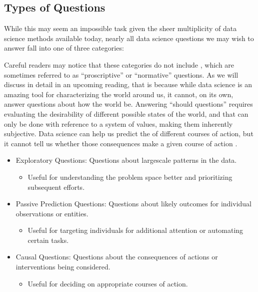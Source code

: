 \documentclass[letterpaper,10pt,english]{jupyterBook}
\begin{document}
\subsection{Types of Questions}
\label{\detokenize{10_introduction/10_our_approach:types-of-questions}}
\sphinxAtStartPar
While this may seem an impossible task given the sheer multiplicity of data science methods available today, nearly all data science questions we may wish to answer fall into one of three categories:%
\begin{footnote}[2]\sphinxAtStartFootnote
Careful readers may notice that these categories do not include , which are sometimes referred to as “proscriptive” or “normative” questions. As we will discuss in detail in an upcoming reading, that is because while data science is an amazing tool for characterizing the world around us, it cannot, on its own, answer questions about how the world  be. Answering “should questions” requires evaluating the desirability of different possible states of the world, and that can only be done with reference to a system of values, making them inherently subjective. Data science can help us predict the  of different courses of action, but it cannot tell us whether those consequences make a given course of action .
%
\end{footnote}
\begin{itemize}
\item {} 
\sphinxAtStartPar
Exploratory Questions: Questions about large\sphinxhyphen{}scale patterns in the data.
\begin{itemize}
\item {} 
\sphinxAtStartPar
Useful for understanding the problem space better and prioritizing subsequent efforts.

\end{itemize}

\item {} 
\sphinxAtStartPar
Passive Prediction Questions: Questions about likely outcomes for individual observations or entities.
\begin{itemize}
\item {} 
\sphinxAtStartPar
Useful for targeting individuals for additional attention or automating certain tasks.

\end{itemize}

\item {} 
\sphinxAtStartPar
Causal Questions: Questions about the consequences of actions or interventions being considered.
\begin{itemize}
\item {} 
\sphinxAtStartPar
Useful for deciding on appropriate courses of action.

\end{itemize}

\end{itemize}
\end{document}
